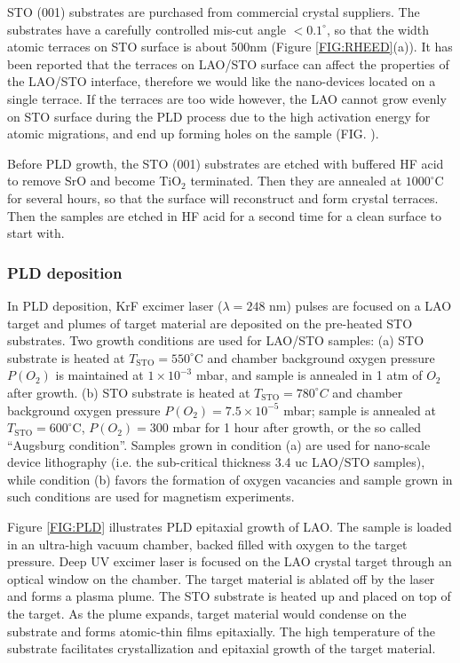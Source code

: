 \documentclass[pdflatex, sectionletters, 12pt]{pittetd}    %
\begin{document}
STO (001) substrates are purchased from commercial crystal suppliers. The substrates have a carefully controlled mis-cut angle $< 0.1^{\circ}$, so that the width atomic terraces on STO surface is about 500nm (Figure \ref{FIG:RHEED}(a)). It has been reported that the terraces on LAO/STO surface can affect the properties of the LAO/STO interface\cite{}, therefore we would like the nano-devices located on a single terrace. If the terraces are too wide however, the LAO cannot grow evenly on STO surface during the PLD process due to the high activation energy for atomic migrations, and end up forming holes on the sample (FIG. \cite{}). 

Before PLD growth, the STO (001) substrates are etched with buffered HF acid to remove SrO and become TiO$_2$ terminated. Then they are annealed at $1000^{\circ}$C for several hours, so that the surface will reconstruct and form crystal terraces\cite{}. Then the samples are etched in HF acid for a second time for a clean surface to start with. 

\subsubsection{PLD deposition}

In PLD deposition, KrF excimer laser ($\lambda = 248$ nm) pulses are focused on a LAO target and plumes of target material are deposited on the pre-heated STO substrates. Two growth conditions are used for LAO/STO samples: (a) STO substrate is heated at $T_\mathrm{STO} = 550^{\circ}$C and chamber background oxygen pressure $P(O_2)$ is maintained at $1 \times 10^{-3}$ mbar, and sample is annealed in 1 atm of $O_2$ after growth. (b) STO substrate is heated at $T_\mathrm{STO} = 780^{\circ}C$ and chamber background oxygen pressure $P(O_2) = 7.5 \times 10^{-5}$ mbar; sample is annealed at $T_\mathrm{STO} = 600^{\circ}$C, $P(O_2) = 300$ mbar for 1 hour after growth, or the so called ``Augsburg condition''. Samples grown in condition (a) are used for nano-scale device lithography (i.e. the sub-critical thickness 3.4 uc LAO/STO samples), while condition (b) favors the formation of oxygen vacancies and sample grown in such conditions are used for magnetism experiments\cite{}. 

Figure \ref{FIG:PLD} illustrates PLD epitaxial growth of LAO. The sample is loaded in an ultra-high vacuum chamber, backed filled with oxygen to the target pressure. Deep UV excimer laser is focused on the LAO crystal target through an optical window on the chamber. The target material is ablated off by the laser and forms a plasma plume. The STO substrate is heated up and placed on top of the target. As the plume expands, target material would condense on the substrate and forms atomic-thin films epitaxially. The high temperature of the substrate facilitates crystallization and epitaxial growth of the target material. 
\end{document}

